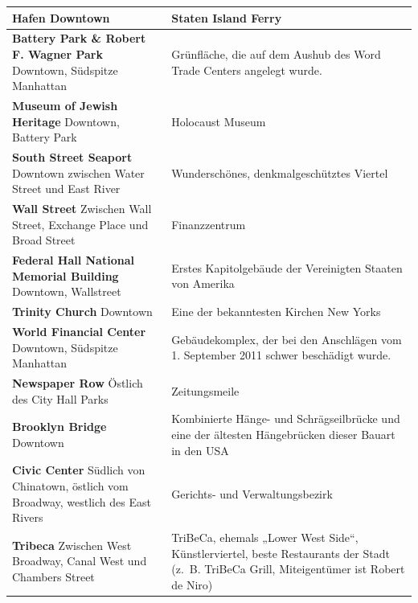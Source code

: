 \documentclass[fontsize=14pt,a4paper,headinclude,DIV=calc,automark]{scrbook}
\begin{document}
{\begin{longtable}{
    >{\raggedright\arraybackslash\columncolor{tablecellblue}}p{5.1cm}
    >{\raggedright\arraybackslash\columncolor{rightcolumn}}p{10cm}
    }
    \textbf{Hafen}\newline
    Downtown & Staten Island Ferry \\ \midrule
    \textbf{Battery Park \& Robert F. Wagner Park}\newline
    Downtown, Südspitze Manhattan & Grünfläche, die auf dem Aushub des Word Trade Centers angelegt wurde. \\ \midrule
    \textbf{Museum of Jewish Heritage}\newline
    Downtown, Battery Park & Holocaust Museum \\ \midrule
    \textbf{South Street Seaport}\newline
    Downtown zwischen Water Street und East River & Wunderschönes, denkmalgeschütztes Viertel \\ \midrule
    \textbf{Wall Street}\newline
    Zwischen Wall Street, Exchange Place und Broad Street & Finanzzentrum \\ \midrule
    \textbf{Federal Hall National Memorial Building }\newline
    Downtown, Wallstreet & Erstes Kapitolgebäude der Vereinigten Staaten von Amerika \\ \midrule
    \textbf{Trinity Church}\newline
    Downtown & Eine der bekanntesten Kirchen New Yorks \\ \midrule
    \textbf{World Financial Center}\newline
    Downtown, Südspitze Manhattan & Gebäudekomplex, der bei den Anschlägen vom 1. September 2011 schwer beschädigt wurde. \\ \midrule
    \textbf{Newspaper Row}\newline
    Östlich des City Hall Parks & Zeitungsmeile \\ \midrule
    \textbf{Brooklyn Bridge}\newline
    Downtown & Kombinierte Hänge- und Schrägseilbrücke und eine der ältesten Hängebrücken dieser Bauart in den USA \\ \midrule
    \textbf{Civic Center}\newline
    Südlich von Chinatown, östlich vom Broadway, westlich des East Rivers & Gerichts- und Verwaltungsbezirk \\ \midrule
    \textbf{Tribeca}\newline
    Zwischen West Broadway, Canal West und Chambers Street & TriBeCa, ehemals „Lower West Side“, Künstlerviertel, beste Restaurants der Stadt (z. B. TriBeCa Grill, Miteigentümer ist Robert de Niro) \\ \midrule

\end{longtable}}
\end{document}
